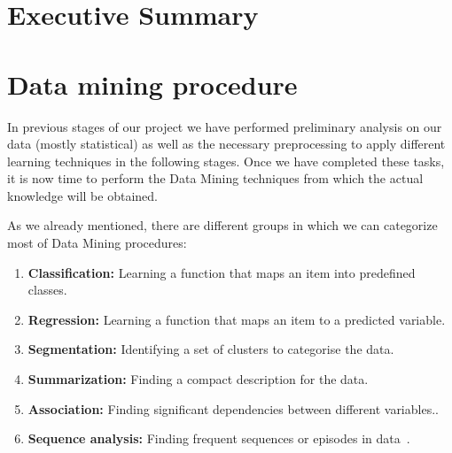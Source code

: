\documentclass[a4paper,12pt]{article}
\begin{document}
\newcommand\litem[1]{\item{\bfseries #1 }}
\renewcommand{\arraystretch}{1.5} %

\newcommand\headcell[1]{%
  \multicolumn{1}{c|}{\cellcolor{MidnightBlue}\bfseries\sffamily\textcolor{white}{#1}}
}

%

\onehalfspacing



\section*{Executive Summary}


\newpage
\tableofcontents %
\cleardoublepage
{} %
\listoffigures %

\cleardoublepage
{} %
\listoftables %
\cleardoublepage

\setcounter{page}{1}

\section{Data mining procedure}
In previous stages of our project we have performed preliminary analysis on our data (mostly statistical) as well as the necessary preprocessing to apply different learning techniques in the following stages. Once we have completed these tasks, it is now time to perform the Data Mining techniques from which the actual knowledge will be obtained.

As we already mentioned, there are different groups in which we can categorize most of Data Mining procedures:

\begin{enumerate}
 \litem{Classification:} Learning a function that maps an item into predefined classes.
 \litem{Regression:} Learning a function that maps an item to a predicted variable.
 \litem{Segmentation:} Identifying a set of clusters to categorise the data.
 \litem{Summarization:} Finding a compact description for the data.
 \litem{Association:} Finding significant dependencies between different variables.\cite{Zhao2003association}.
 \litem{Sequence analysis:} Finding frequent sequences or episodes in data~\cite{zhao2003sequential,weiss2002predicting}.
\end{enumerate}
\end{document}
